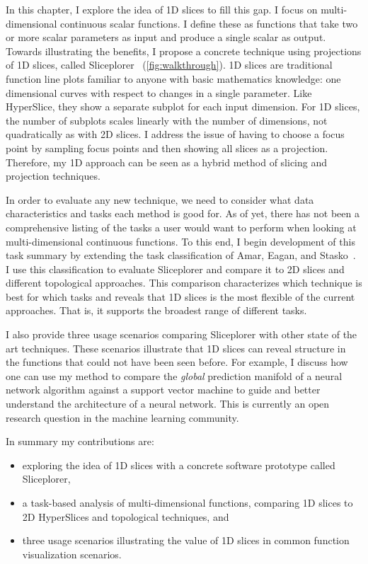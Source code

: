In this chapter, I explore the idea of 1D slices to fill this gap. I focus on
multi-dimensional continuous scalar functions. I define these as functions that
take two or more scalar parameters as input and produce a single scalar as
output.  Towards illustrating the benefits, I propose a concrete technique
using projections of 1D slices, called Sliceplorer~\cite{Torsney-Weir:2017a}
(\autoref{fig:walkthrough}).  1D slices are traditional function line plots
familiar to anyone with basic mathematics knowledge: one dimensional curves
with respect to changes in a single parameter.  Like HyperSlice, they show a
separate subplot for each input dimension. For 1D slices, the number of
subplots scales linearly with the number of dimensions, not quadratically as
with 2D slices. I address the issue of having to choose a focus point by
sampling focus points and then showing all slices as a projection. Therefore,
my 1D approach can be seen as a hybrid method of slicing and projection
techniques. 

In order to evaluate any new technique, we need to
consider what data characteristics and tasks each method is good for. As of yet, there has not been a comprehensive
listing of the tasks a user would want to perform when looking at
multi-dimensional continuous functions. To this
end, I begin development of this task summary by extending the task
classification of Amar, Eagan, and Stasko~\cite{Amar:2005}. I use this
classification to evaluate Sliceplorer and compare it to 2D slices and
different topological approaches. This comparison characterizes
which technique is best for which tasks and reveals that 1D slices is the most
flexible of the current approaches. That is, it supports the broadest range of
different tasks.

I also provide three usage scenarios comparing Sliceplorer with other state of the art techniques. These scenarios illustrate that 1D
slices can reveal structure in the functions that could not
have been seen before. For example, I discuss how one can use my
method to compare the \emph{global} prediction manifold of a neural
network algorithm against a support vector machine to guide and better understand the architecture of a neural network. This is currently an open research question in the machine learning community.

In summary my contributions are: 
\begin{itemize}
\item exploring the idea of 1D slices with a concrete software prototype called Sliceplorer,
\item a task-based analysis of multi-dimensional functions, comparing 1D slices to 2D HyperSlices and topological techniques, and
\item %
three usage scenarios illustrating the value of 1D slices in common function 
      visualization scenarios. 
\end{itemize}


